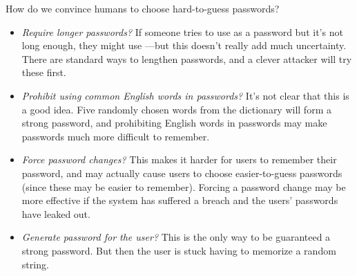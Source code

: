 
How do we convince humans to choose hard-to-guess passwords? 

\begin{itemize}
  \item \emph{Require longer passwords?} If someone tries to use 
     as a password but it's not long
    enough, they might use ---but
    this doesn't really add much uncertainty.
    There are standard ways to lengthen passwords,
    and a clever attacker will try these first.
  \item \emph{Prohibit using common English words in passwords?}
    It's not clear that this is a good idea.
    Five randomly chosen words from the dictionary will
    form a strong password, and prohibiting English words
    in passwords may make passwords much more difficult to remember.
      
  \item \emph{Force password changes?}
    This makes it harder for users to remember their password, and
    may actually cause users to choose easier-to-guess passwords
    (since these may be easier to remember).
    Forcing a password change may be more effective if the system has
    suffered a breach and the users' passwords have leaked out.
  \item \emph{Generate password for the user?} This is the only way
    to be guaranteed a strong password. But then the user is stuck
    having to memorize a random string.

\end{itemize}

